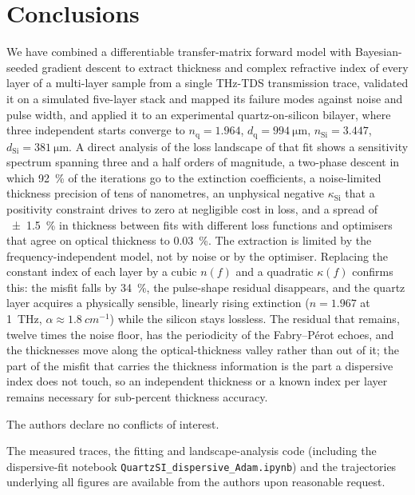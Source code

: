 \documentclass{optica-article}
\newcommand{\kap}{\kappa}
\begin{document}
\section{Conclusions}\label{sec:conclusions}
We have combined a differentiable transfer-matrix forward model with Bayesian-seeded gradient descent to extract thickness and complex refractive index of every layer of a multi-layer sample from a single THz-TDS transmission trace, validated it on a simulated five-layer stack and mapped its failure modes against noise and pulse width, and applied it to an experimental quartz-on-silicon bilayer, where three independent starts converge to $n_{\mathrm{q}}=1.964$, $d_{\mathrm{q}}=\SI{994}{\micro\metre}$, $n_{\mathrm{Si}}=3.447$, $d_{\mathrm{Si}}=\SI{381}{\micro\metre}$. A direct analysis of the loss landscape of that fit shows a sensitivity spectrum spanning three and a half orders of magnitude, a two-phase descent in which \SI{92}{\percent} of the iterations go to the extinction coefficients, a noise-limited thickness precision of tens of nanometres, an unphysical negative $\kap_{\mathrm{Si}}$ that a positivity constraint drives to zero at negligible cost in loss, and a spread of \SI{\pm1.5}{\percent} in thickness between fits with different loss functions and optimisers that agree on optical thickness to \SI{0.03}{\percent}. The extraction is limited by the frequency-independent model, not by noise or by the optimiser. Replacing the constant index of each layer by a cubic $n(f)$ and a quadratic $\kap(f)$ confirms this: the misfit falls by \SI{34}{\percent}, the pulse-shape residual disappears, and the quartz layer acquires a physically sensible, linearly rising extinction ($n=1.967$ at \SI{1}{THz}, $\alpha\approx\SI{1.8}{cm^{-1}}$) while the silicon stays lossless. The residual that remains, twelve times the noise floor, has the periodicity of the Fabry--P\'erot echoes, and the thicknesses move along the optical-thickness valley rather than out of it; the part of the misfit that carries the thickness information is the part a dispersive index does not touch, so an independent thickness or a known index per layer remains necessary for sub-percent thickness accuracy.


\begin{backmatter}
 \todo{[to be added]}

 \todo{[to be added]}

 The authors declare no conflicts of interest. 

 The measured traces, the fitting and landscape-analysis code (including the dispersive-fit notebook \texttt{QuartzSI\_\-dispersive\_\-Adam.ipynb}) and the trajectories underlying all figures are available from the authors upon reasonable request. 
\end{backmatter}


\end{document}
